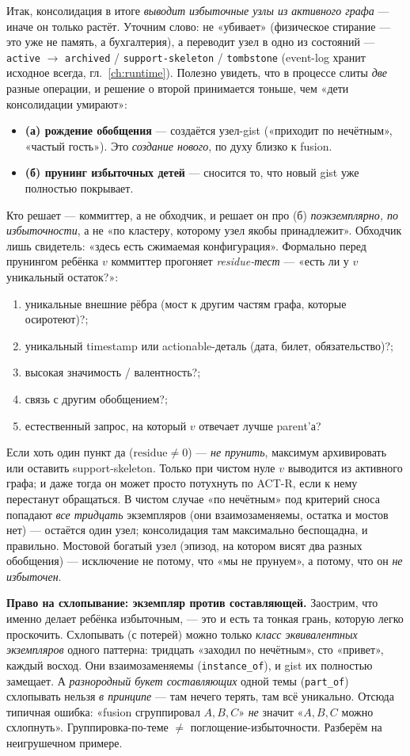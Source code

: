 Итак, консолидация в итоге \emph{выводит избыточные узлы из активного графа}
--- иначе он только растёт. Уточним слово: не «убивает» (физическое стирание
--- это уже не память, а бухгалтерия), а переводит узел в одно из состояний
--- \texttt{active} $\to$ \texttt{archived} / \texttt{support-skeleton} /
\texttt{tombstone} (event-log хранит исходное всегда, гл.~\ref{ch:runtime}).
Полезно увидеть, что в процессе слиты \emph{две} разные операции, и решение о
второй принимается тоньше, чем «дети консолидации умирают»:
\begin{itemize}
\item \textbf{(а) рождение обобщения} --- создаётся узел-gist («приходит по
нечётным», «частый гость»). Это \emph{создание нового}, по духу близко к
fusion.
\item \textbf{(б) прунинг избыточных детей} --- сносится то, что новый gist уже
полностью покрывает.
\end{itemize}
Кто решает --- коммиттер, а не обходчик, и решает он про (б)
\emph{поэкземплярно, по избыточности}, а не «по кластеру, которому узел якобы
принадлежит». Обходчик лишь свидетель: «здесь есть сжимаемая конфигурация».
Формально перед прунингом ребёнка $v$ коммиттер прогоняет
\emph{residue-тест} --- «есть ли у $v$ уникальный остаток?»:
\begin{enumerate}
\item уникальные внешние рёбра (мост к другим частям графа, которые
осиротеют)?;
\item уникальный timestamp или actionable-деталь (дата, билет, обязательство)?;
\item высокая значимость / валентность?;
\item связь с другим обобщением?;
\item естественный запрос, на который $v$ отвечает лучше parent'а?
\end{enumerate}
Если хоть один пункт да ($\mathrm{residue} \ne 0$) --- \emph{не прунить},
максимум архивировать или оставить support-skeleton. Только при чистом нуле
$v$ выводится из активного графа; и даже тогда он может просто потухнуть по
ACT-R, если к нему перестанут обращаться. В чистом случае «по нечётным» под
критерий сноса попадают \emph{все тридцать} экземпляров (они взаимозаменяемы,
остатка и мостов нет) --- остаётся один узел; консолидация там максимально
беспощадна, и правильно. Мостовой богатый узел (эпизод, на котором висят два
разных обобщения) --- исключение не потому, что «мы не прунуем», а потому,
что он \emph{не избыточен}.

\smallskip\noindent\textbf{Право на схлопывание: экземпляр против составляющей.}
Заострим, что именно делает ребёнка избыточным, --- это и есть та тонкая
грань, которую легко проскочить. Схлопывать (с потерей) можно только
\emph{класс эквивалентных экземпляров} одного паттерна: тридцать «заходил по
нечётным», сто «привет», каждый восход. Они взаимозаменяемы
(\texttt{instance\_of}), и gist их полностью замещает. А \emph{разнородный
букет составляющих} одной темы (\texttt{part\_of}) схлопывать нельзя
\emph{в принципе} --- там нечего терять, там всё уникально. Отсюда типичная
ошибка: «fusion сгруппировал $A, B, C$» \emph{не} значит «$A, B, C$ можно
схлопнуть». Группировка-по-теме $\ne$ поглощение-избыточности. Разберём на
неигрушечном примере.


